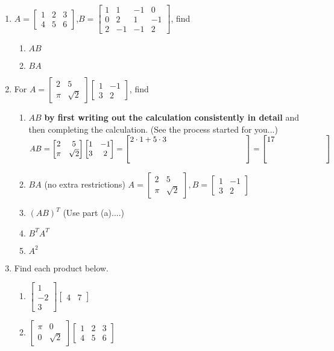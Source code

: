 \documentclass[11pt,fleqn]{article}
\newcommand{\bbm}{\begin{bmatrix}}
\newcommand{\ebm}{\end{bmatrix}}
\begin{document}
\renewcommand{\headrulewidth}{0pt}
\newcommand{\blank}[1]{\rule{#1}{0.75pt}}
\renewcommand{\d}{\displaystyle}
\vspace*{-0.7in}
\begin{center}
 \textbf{ \large {} }
\end{center}

\begin{enumerate}
\item $A=\bbm 1&2&3\\4&5&6 \ebm$,\;$B= \bbm 1&1&-1&0\\0&2&1&-1\\2&-1&-1&2 \ebm$, find
	\begin{enumerate}
	\item $AB$
	\vfill
	\item $BA$
	\vfill
	\end{enumerate}
\item For $A=\bbm 2&5\\ \pi& \sqrt{2} \ebm \bbm 1&-1\\3&2 \ebm$, find 
	\begin{enumerate}
	\item $AB$ \textbf{by first writing out the calculation consistently in detail} and then completing the calculation. (See the process started for you...)\\
	
	$AB=\bbm 2&5\\ \pi& \sqrt{2} \ebm \bbm 1&-1\\3&2 \ebm=\bbm 2 \cdot 1+5 \cdot 3 &\quad \hspace{1in}\quad\\&\\ & \ebm=\bbm 17& \quad\hspace{.5in}
	\quad\\&\\& \ebm$
	\vfill
	\item $BA$ (no extra restrictions)
	\vfill
	\newpage
	$A=\bbm 2&5\\ \pi& \sqrt{2} \ebm,$\;$B=\bbm 1&-1\\3&2 \ebm$
	\item $(AB)^T$ (Use part (a)....)
	\vfill
	\item $B^TA^T$
	\vfill
	\item $A^2$
	\vfill
	\end{enumerate}
\newpage
\item Find each product below.
	\begin{enumerate}
	\item $\bbm 1\\-2\\3\ebm \bbm 4&7 \ebm$
	\vfill
	\item $\bbm \pi & 0 \\ 0 & \sqrt{2} \ebm \bbm 1&2&3\\4&5&6\ebm$
	\vfill


\end{enumerate}
\end{enumerate}
\end{document}
